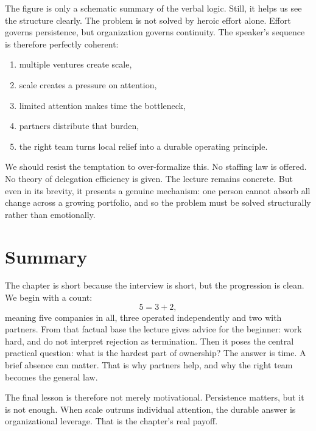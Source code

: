 The figure is only a schematic summary of the verbal logic. Still, it helps us see the structure clearly. The problem is not solved by heroic effort alone. Effort governs persistence, but organization governs continuity. The speaker's sequence is therefore perfectly coherent:

\begin{enumerate}
\item multiple ventures create scale,
\item scale creates a pressure on attention,
\item limited attention makes time the bottleneck,
\item partners distribute that burden,
\item the right team turns local relief into a durable operating principle.
\end{enumerate}

We should resist the temptation to over-formalize this. No staffing law is offered. No theory of delegation efficiency is given. The lecture remains concrete. But even in its brevity, it presents a genuine mechanism: one person cannot absorb all change across a growing portfolio, and so the problem must be solved structurally rather than emotionally.

\section{Summary}

The chapter is short because the interview is short, but the progression is clean. We begin with a count:
\[
5 = 3 + 2,
\]
meaning five companies in all, three operated independently and two with partners. From that factual base the lecture gives advice for the beginner: work hard, and do not interpret rejection as termination. Then it poses the central practical question: what is the hardest part of ownership? The answer is time. A brief absence can matter. That is why partners help, and why the right team becomes the general law.

The final lesson is therefore not merely motivational. Persistence matters, but it is not enough. When scale outruns individual attention, the durable answer is organizational leverage. That is the chapter's real payoff.